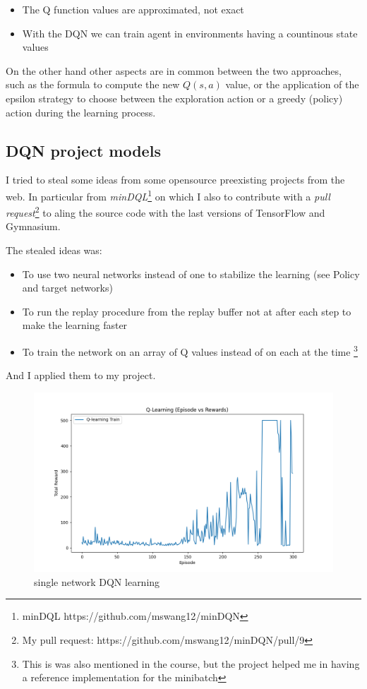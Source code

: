 \documentclass{article}
\begin{document}
\begin{itemize}
  \item{The Q function values are approximated, not exact}
  \item{With the DQN we can train agent in environments having a countinous state values}
\end{itemize}

On the other hand other aspects are in common between the two approaches, such as
the formula to compute the new $Q(s,a)$ value, or the application of the epsilon strategy
to choose between the exploration action or a greedy (policy) action during the learning process.

\subsection{DQN project models}

I tried to steal some ideas from some opensource preexisting projects from the web.
In particular from \emph{minDQL}\footnote{minDQL https://github.com/mswang12/minDQN} on which I also to contribute with 
a \emph{pull request}\footnote{My pull request: https://github.com/mswang12/minDQN/pull/9} 
to aling the source code with the last versions of TensorFlow and Gymnasium.

The stealed ideas was:

\begin{itemize}
  \item{To use two neural networks instead of one to stabilize the learning (see Policy and target networks)}
  \item{To run the replay procedure from the replay buffer not at after each step to make the learning faster}
  \item{To train the network on an array of Q values instead of on each at the time
  \footnote{This is was also mentioned in the course, but the project helped me in having a 
  reference implementation for the minibatch}}
\end{itemize}

And I applied them to my project.

\begin{figure}
  \includegraphics[width=\linewidth]{DQN-0001.png}
  \caption{single network DQN learning}
  \label{fig:dqn-1}
\end{figure}
\end{document}
